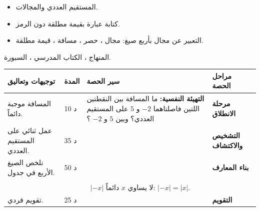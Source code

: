 \documentclass[12pt,a4paper]{article}
\newenvironment{LTR}{\begin{otherlanguage}{english}}{\end{otherlanguage}}
\newcommand{\ar}[1]{\foreignlanguage{arabic}{#1}}
\newcommand{\Phase}[1]{\textbf{#1}}
\newenvironment{Sayr}{%
\begin{LTR}\renewcommand{\arraystretch}{1.25}
\begin{longtable}{|p{0.17\textwidth}|>{\centering\arraybackslash}p{0.06\textwidth}|p{0.53\textwidth}|>{\centering\arraybackslash}p{0.12\textwidth}|}
\hline\rowcolor{cThm!12}\ar{\textbf{توجيهات وتعاليق}} & \ar{\textbf{المدة}} & \ar{\textbf{سير الحصة}} & \ar{\textbf{مراحل الحصة}}\\\hline\endhead
\hline\endfoot}{\end{longtable}\end{LTR}}
\newcommand{\Row}[4]{\ar{\small #4} & \ar{#3} & \ar{#2} & \cellcolor{cThm!8}\ar{\Phase{#1}}\\\hline}
\newcommand{\Lab}[2]{\foreignlanguage{english}{\tcbox[on line,colback=#1,colframe=#1,boxrule=0pt,arc=2pt,boxsep=1pt,left=5pt,right=5pt,top=1pt,bottom=1pt]{\ar{\textcolor{white}{\textbf{#2}}}}}}
\newcommand{\Num}[1]{\foreignlanguage{english}{\tikz[baseline=(c.base)]\node[fill=cDef,text=white,inner sep=2pt,font=\footnotesize\bfseries](c){#1};}}
\newcommand{\ck}{\ensuremath{{\color{cRem}\checkmark}}}
\begin{document}
{\begin{itemize}\item المستقيم العددي والمجالات.\end{itemize}}%
{\begin{itemize}\item كتابة عبارة بقيمة مطلقة دون الرمز.\item التعبير عن مجال بأربع صيغ: مجال ، حصر ، مسافة ، قيمة مطلقة.\end{itemize}}%
{المنهاج ، الكتاب المدرسي ، السبورة.}
\begin{Sayr}
\Row{مرحلة الانطلاق}{%
\textbf{التهيئة النفسية:} ما المسافة بين النقطتين اللتين فاصلتاهما $-2$ و $5$ على المستقيم العددي؟ وبين $5$ و $-2$ ؟}{10 د}{المسافة موجبة دائماً.}
\Row{التشخيص والاكتشاف}{%
\Lab{cEx}{مناقشة نشاط 04 صفحة 25}\par\ck\ المسافة بين نقطتين فاصلتاهما $a$ و $b$ هي $b-a$ إذا كان $a\leqslant b$ ، و $a-b$ إذا كان $b\leqslant a$: نرمز لها $|a-b|$.\par
\ck\ الأعداد التي تبعد عن $3$ بأقل من $2$ أو تساوي $2$: $1\leqslant x\leqslant5$.\par
}{35 د}{عمل ثنائي على المستقيم العددي.}
\Row{بناء المعارف}{%
\Lab{cDef}{تعريف}\ $|x|=x$ إذا كان $x\geqslant0$ ، و $|x|=-x$ إذا كان $x\leqslant0$. \ المسافة بين $a$ و $b$: $|a-b|=|b-a|$.\par\Lab{cThm}{خاصية}\ $|xy|=|x|\,|y|$ ؛ $\sqrt{x^2}=|x|$ ؛ $|x+y|\leqslant|x|+|y|$.\par}{50 د}{نلخص الصيغ الأربع في جدول.}
\Row{}{%
\Lab{cThm}{الصيغ الأربع}\ من أجل $r>0$: \ $|x-a|\leqslant r\iff a-r\leqslant x\leqslant a+r\iff x\in[a-r;a+r]$ ، أي: $x$ يبعد عن $a$ بـ $r$ على الأكثر.\par\Lab{cEx}{مثال}\par\ck\ $|\sqrt2-2|=2-\sqrt2$ لأن $\sqrt2<2$.\par
\ck\ المجال $[-1;7]$ مركزه $3$ ونصف قطره $4$: $x\in[-1;7]\iff|x-3|\leqslant4$.\par
}{}{}
\Row{}{%
\Lab{cThm!80!black}{حذار}\ $|-x|$ لا يساوي $x$ دائماً: $|-x|=|x|$.}{}{}
\Row{التقويم}{%
\Lab{cEx}{تطبيق}\par\Num{1} اكتب بمجال: $|x+1|<3$. \ \Num{2} اكتب $[2;8]$ بقيمة مطلقة. \ \Num{3} اكتب $|\pi-4|$ دون الرمز.\par\textbf{الحل:} \Num{1} $]-4;2[$ ؛ \Num{2} $|x-5|\leqslant3$ ؛ \Num{3} $4-\pi$.\par\textbf{واجب منزلي:} تمارين من الكتاب المدرسي.\par\smallskip\textbf{ملاحظات حول سير الحصة:} \dotfill}{25 د}{تقويم فردي.}
\end{Sayr}
\end{document}
